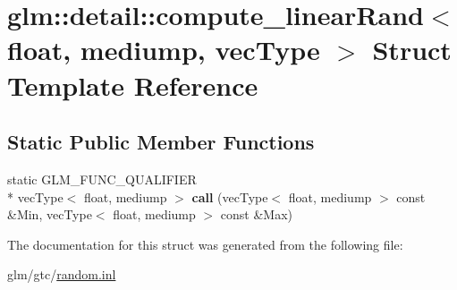 \hypertarget{structglm_1_1detail_1_1compute__linearRand_3_01float_00_01mediump_00_01vecType_01_4}{\section{glm\-:\-:detail\-:\-:compute\-\_\-linear\-Rand$<$ float, mediump, vec\-Type $>$ Struct Template Reference}
\label{structglm_1_1detail_1_1compute__linearRand_3_01float_00_01mediump_00_01vecType_01_4}
}
\subsection*{Static Public Member Functions}
\begin{DoxyCompactItemize}
\item 
\hypertarget{structglm_1_1detail_1_1compute__linearRand_3_01float_00_01mediump_00_01vecType_01_4_a9202e17262bd8b1ffb9804bf681e1d49}{static G\-L\-M\-\_\-\-F\-U\-N\-C\-\_\-\-Q\-U\-A\-L\-I\-F\-I\-E\-R \\*
vec\-Type$<$ float, mediump $>$ {\bfseries call} (vec\-Type$<$ float, mediump $>$ const \&Min, vec\-Type$<$ float, mediump $>$ const \&Max)}\label{structglm_1_1detail_1_1compute__linearRand_3_01float_00_01mediump_00_01vecType_01_4_a9202e17262bd8b1ffb9804bf681e1d49}

\end{DoxyCompactItemize}


The documentation for this struct was generated from the following file\-:\begin{DoxyCompactItemize}
\item 
glm/gtc/\hyperlink{random_8inl}{random.\-inl}\end{DoxyCompactItemize}
